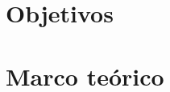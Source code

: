 \documentclass[letterpaper, oneside, openright, 12pt]{book}
\begin{document}
  \chapter{Objetivos}
  
  \newpage %

  \chapter{Marco teórico}
  
  \newpage %






\end{document}

